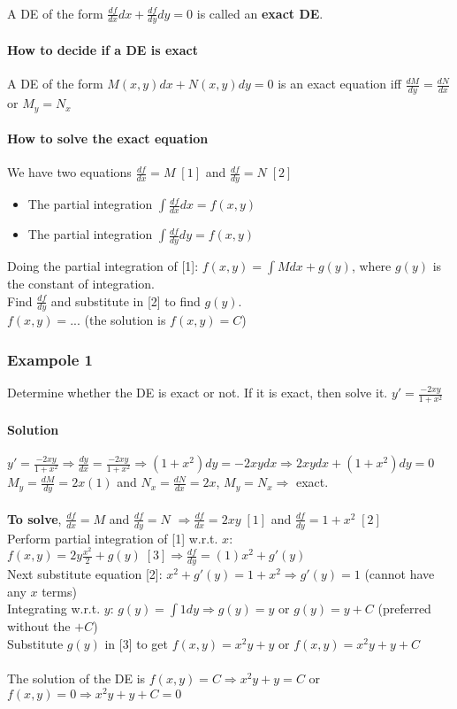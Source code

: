 \documentclass{article}
\begin{document}
\paragraph{}A DE of the form $\frac{df}{dx}dx+\frac{df}{dy}dy=0$ is called an \textbf{exact DE}.
\paragraph{How to decide if a DE is exact}A DE of the form $M(x,y)dx+N(x,y)dy=0$ is an exact equation iff $\frac{dM}{dy}=\frac{dN}{dx}$ or $M_y=N_x$
\paragraph{How to solve the exact equation}We have two equations $\frac{df}{dx}=M\;[1]$ and $\frac{df}{dy}=N\;[2]$
\begin{itemize}
    \itemsep 0em
    \item The partial integration $\int\frac{df}{dx}dx=f(x,y)$
    \item The partial integration $\int\frac{df}{dy}dy=f(x,y)$
\end{itemize}
Doing the partial integration of [1]: $f(x,y)=\int Mdx+g(y)$, where $g(y)$ is the constant of integration.
\\Find $\frac{df}{dy}$ and substitute in [2] to find $g(y)$.
\\$f(x,y)=...$ (the solution is $f(x,y)=C$)

\subsubsection{Exampole 1}
Determine whether the DE is exact or not. If it is exact, then solve it. $y'=\frac{-2xy}{1+x^2}$

\paragraph{Solution} $y'=\frac{-2xy}{1+x^2}\Rightarrow\frac{dy}{dx}=\frac{-2xy}{1+x^2}\Rightarrow (1+x^2)dy=-2xydx\Rightarrow2xydx+(1+x^2)dy=0$
\\$M_y=\frac{dM}{dy}=2x(1)$ and $N_x=\frac{dN}{dx}=2x$, $M_y=N_x\Rightarrow$ exact.
\\\\\textbf{To solve}, $\frac{df}{dx}=M$ and $\frac{df}{dy}=N$
$\Rightarrow\frac{df}{dx}=2xy\;[1]$ and $\frac{df}{dy}=1+x^2\;[2]$
\\Perform partial integration of [1] w.r.t. $x$:
$f(x,y)=2y\frac{x^2}{2}+g(y)\;[3]\Rightarrow \frac{df}{dy}=(1)x^2+g'(y)$
\\Next substitute equation [2]:
$x^2+g'(y)=1+x^2\Rightarrow g'(y)=1$ (cannot have any $x$ terms)
\\Integrating w.r.t. $y$: $g(y)=\int1dy\Rightarrow g(y)=y$ or $g(y)=y+C$ (preferred without the $+C$)
\\Substitute $g(y)$ in [3] to get $f(x,y)=x^2y+y$ or $f(x,y)=x^2y+y+C$
\\\\The solution of the DE is $f(x,y)=C\Rightarrow x^2y+y=C$ or $f(x,y)=0\Rightarrow x^2y+y+C=0$
\end{document}

